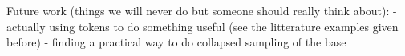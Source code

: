 Future work (things we will never do but someone should really think about):
- actually using tokens to do something useful (see the litterature examples given before)
- finding a practical way to do collapsed sampling of the base
